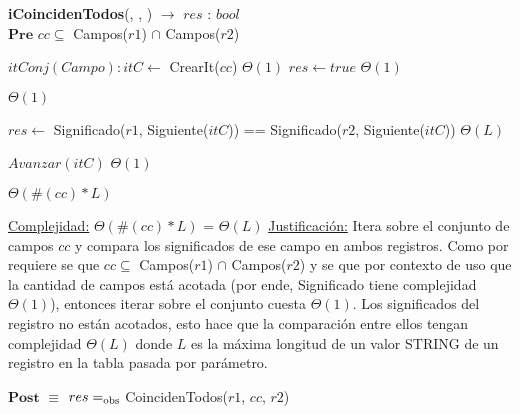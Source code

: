 \begin{algorithm}[H]{{\textbf{iCoincidenTodos}(, , )} $\to$ $res$ : $bool$}
	{\\ $\textbf{Pre}$ $cc \subseteq$ Campos($r1$) $\cap$ Campos($r2$)}
    	\begin{algorithmic}[1]

    		\State $itConj(Campo): itC \gets$ CrearIt($cc$) \Comment $\Theta(1)$
    		\State $res \gets true$ \Comment $\Theta(1)$

    		 \Comment $\Theta(1)$
    			
    			\State $res \gets$ Significado($r1$, Siguiente($itC$)) == Significado($r2$, Siguiente($itC$)) \Comment $\Theta(L)$
    			
    			\State $Avanzar(itC)$ \Comment $\Theta(1)$
    		
    		\EndWhile 
    		\Comment $\Theta(\#(cc)*L)$

			\medskip
			\Statex \underline{Complejidad:} $\Theta(\#(cc)*L)$ = $\Theta(L)$
			\Statex \underline{Justificación:} Itera sobre el conjunto de campos $cc$ y compara los significados de ese campo en ambos registros. Como por requiere se que $cc \subseteq$ Campos($r1$) $\cap$ Campos($r2$) y se que por contexto de uso que la cantidad de campos está acotada (por ende, Significado tiene complejidad $\Theta(1)$), entonces iterar sobre el conjunto cuesta $\Theta(1)$. Los significados del registro no están acotados, esto hace que la comparación entre ellos tengan complejidad $\Theta(L)$ donde $L$ es la máxima longitud de un valor STRING de un registro en la tabla pasada por parámetro.
    	\end{algorithmic}
	{$\textbf{Post}$ $\equiv$ $res =_{\mathrm{obs}}$ CoincidenTodos($r1$, $cc$, $r2$)}
\end{algorithm}





